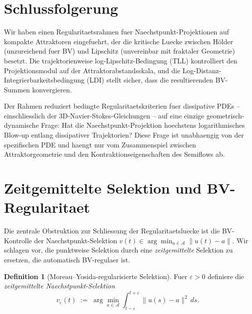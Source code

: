 \documentclass[12pt,a4paper]{article}
\theoremstyle{definition}
\newtheorem{definition}{Definition}[section]
\theoremstyle{plain}
\theoremstyle{remark}
\begin{document}
\section{Schlussfolgerung}

Wir haben einen Regularitaetsrahmen fuer Naechstpunkt-Projektionen
auf kompakte Attraktoren eingefuehrt, der die kritische Luecke
zwischen H\"older (unzureichend fuer BV) und Lipschitz (unvereinbar
mit fraktaler Geometrie) besetzt.  Die trajektorienweise
log-Lipschitz-Bedingung (TLL) kontrolliert den Projektionsmodul auf
der Attraktorabstandsskala, und die
Log-Distanz-Integrierbarkeitsbedingung (LDI) stellt sicher, dass die
resultierenden BV-Summen konvergieren.

Der Rahmen reduziert bedingte Regularitaetskriterien fuer dissipative
PDEs -- einschliesslich der 3D-Navier-Stokes-Gleichungen -- auf eine
einzige geometrisch-dynamische Frage: Hat die Naechstpunkt-Projektion
hoechstens logarithmisches Blow-up entlang dissipativer Trajektorien?
Diese Frage ist unabhaengig von der spezifischen PDE und haengt nur
vom Zusammenspiel zwischen Attraktorgeometrie und den
Kontraktionseigenschaften des Semiflows ab.


\section{Zeitgemittelte Selektion und BV-Regularitaet}
\label{sec:time-averaged}

Die zentrale Obstruktion zur Schliessung der Regularitaetsluecke ist
die BV-Kontrolle der Naechstpunkt-Selektion
$v(t) \in \arg\min_{a \in \mathcal{A}} \|u(t) - a\|$.  Wir schlagen
vor, die punktweise Selektion durch eine \emph{zeitgemittelte}
Selektion zu ersetzen, die automatisch BV-regulaer ist.

\begin{definition}[Moreau--Yosida-regularisierte Selektion]
\label{def:my-selection}
Fuer $\varepsilon > 0$ definiere die \emph{zeitgemittelte
Naechstpunkt-Selektion}
\[
  v_\varepsilon(t)
  \;:=\;
  \arg\min_{a \in \mathcal{A}}
  \int_{t-\varepsilon}^{t+\varepsilon}
  \|u(s) - a\|^2 \, ds.
\]
\end{definition}
\end{document}

